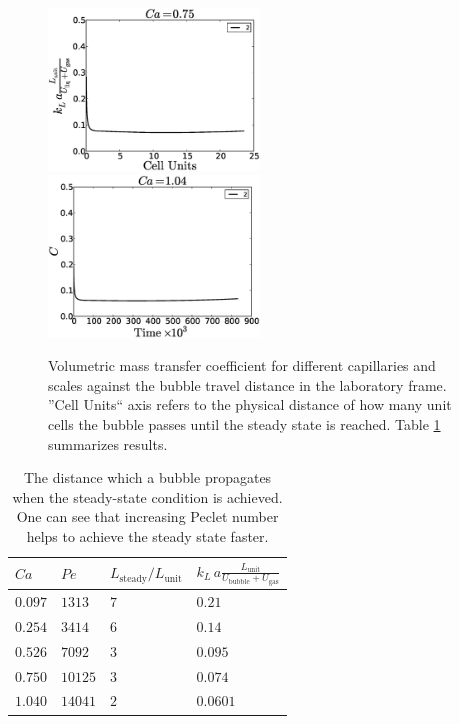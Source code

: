 \documentclass{article}
\newcommand{\vol}{k_L\,a}
\newcommand{\lunit}{L_{\mathrm{unit}}}
\newcommand{\ububble}{U_{\mathrm{bubble}}}
\newcommand{\ugas}{U_{\mathrm{gas}}}
\newcommand{\volnondim}{\vol \frac{\lunit}{\ububble+\ugas}}
\begin{document}
\begin{figure}[htb!]
\includegraphics[width=0.5\textwidth]{Figures/aver_conc_scale_ca05.eps}\\
\includegraphics[width=0.5\textwidth]{Figures/aver_conc_scale_ca14.eps}
\caption{Volumetric mass transfer coefficient for different capillaries and scales against the
bubble travel distance in the laboratory frame. ''Cell Units`` axis refers to the physical
distance of how many unit cells the bubble passes until the steady state is reached. Table
\ref{table:steady:state:average}
summarizes results.\label{fig:aver:conc:different:capillaries}}
\end{figure}
\begin{table}[htb!]
\begin{tabularx}{\textwidth}{|X|X|X|X|}
\hline
$Ca$    &$Pe$     &$L_{\mathrm{steady}}/\lunit$& $\volnondim$ \\
\hline
$0.097$ &$1313$  &$7$&$0.21$  \\ 
$0.254$ &$3414$  &$6$&$0.14$  \\ 
$0.526$ &$7092$  &$3$&$0.095$ \\
$0.750$ &$10125$ &$3$&$0.074$ \\
$1.040$ &$14041$ &$2$&$0.0601$\\
\hline
\end{tabularx}
\caption{The distance which a bubble propagates when the
steady-state condition is achieved. One can see that increasing
Peclet number helps to achieve the steady state faster.\label{table:steady:state:average}}
\end{table}
\end{document}
